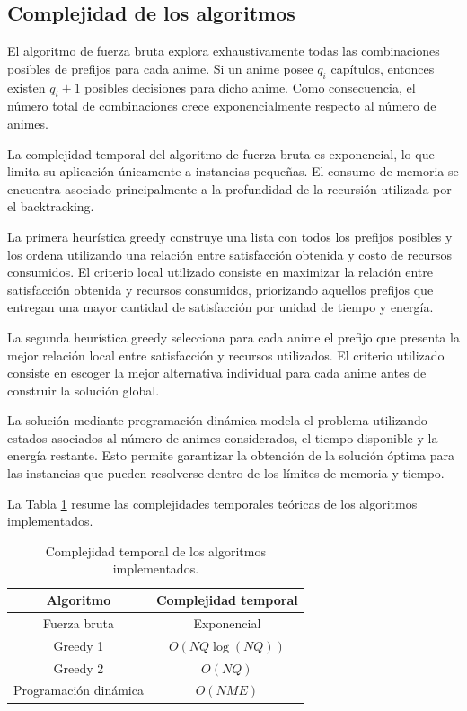 \subsection{Complejidad de los algoritmos}

El algoritmo de fuerza bruta explora exhaustivamente todas las combinaciones posibles de prefijos para cada anime. Si un anime posee \(q_i\) capítulos, entonces existen \(q_i+1\) posibles decisiones para dicho anime. Como consecuencia, el número total de combinaciones crece exponencialmente respecto al número de animes.

La complejidad temporal del algoritmo de fuerza bruta es exponencial, lo que limita su aplicación únicamente a instancias pequeñas. El consumo de memoria se encuentra asociado principalmente a la profundidad de la recursión utilizada por el backtracking.

La primera heurística greedy construye una lista con todos los prefijos posibles y los ordena utilizando una relación entre satisfacción obtenida y costo de recursos consumidos. El criterio local utilizado consiste en maximizar la relación entre satisfacción obtenida y recursos consumidos, priorizando aquellos prefijos que entregan una mayor cantidad de satisfacción por unidad de tiempo y energía.

La segunda heurística greedy selecciona para cada anime el prefijo que presenta la mejor relación local entre satisfacción y recursos utilizados. El criterio utilizado consiste en escoger la mejor alternativa individual para cada anime antes de construir la solución global.

La solución mediante programación dinámica modela el problema utilizando estados asociados al número de animes considerados, el tiempo disponible y la energía restante. Esto permite garantizar la obtención de la solución óptima para las instancias que pueden resolverse dentro de los límites de memoria y tiempo.

La Tabla \ref{tab:complejidad} resume las complejidades temporales teóricas de los algoritmos implementados.

\begin{table}[H]
\centering
\begin{tabular}{c|c}
\hline
Algoritmo & Complejidad temporal \\
\hline
Fuerza bruta & Exponencial \\
Greedy 1 & \(O(NQ \log(NQ))\) \\
Greedy 2 & \(O(NQ)\) \\
Programación dinámica & \(O(NME)\) \\
\hline
\end{tabular}
\caption{Complejidad temporal de los algoritmos implementados.}
\label{tab:complejidad}
\end{table}

